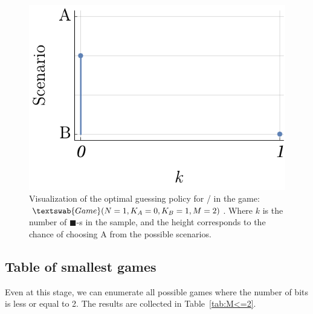\documentclass{article}
\newcommand{\bb}{\blacksquare}
\theoremstyle{definition}
\newcommand{\G}[1]{$\textswab{Game}(#1)$}
\begin{document}
\begin{figure}[H]
    \centering
    \includegraphics[scale=0.7]{img/Policy1012.pdf}
    \caption{Visualization of the optimal guessing policy for \PI/ in the game: \G{N=1,K_A=0,K_B=1,M=2}. Where $k$ is the number of $\bb$-s in the sample, and the height corresponds to the chance of choosing A from the possible scenarios.}
    \label{fig:PolicyPlot1012}
\end{figure}


\subsection{Table of smallest games}

Even at this stage, we can enumerate all possible games where the number of bits is less or equal to 2. The results are collected in Table~\ref{tab:M<=2}.
\end{document}

